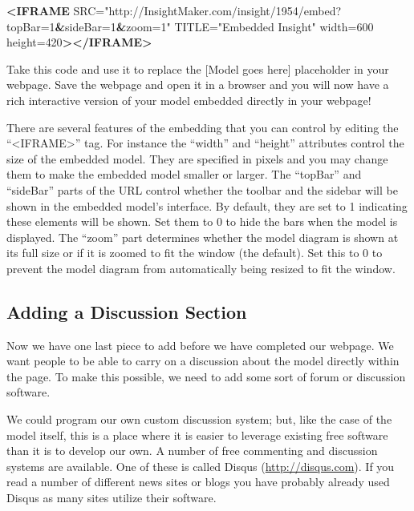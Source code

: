 \documentclass[]{memoir}
\newenvironment{Shaded}{}{}
\newcommand{\KeywordTok}[1]{\textcolor[rgb]{0.00,0.44,0.13}{\textbf{{#1}}}}
\newcommand{\StringTok}[1]{\textcolor[rgb]{0.25,0.44,0.63}{{#1}}}
\newcommand{\OtherTok}[1]{\textcolor[rgb]{0.00,0.44,0.13}{{#1}}}
\newcommand{\ErrorTok}[1]{\textcolor[rgb]{1.00,0.00,0.00}{\textbf{{#1}}}}
\begin{document}
\begin{Shaded}
\begin{Highlighting}[]
\KeywordTok{<IFRAME}\OtherTok{ SRC=}\StringTok{"http://InsightMaker.com/insight/1954/embed?topBar=1}\ErrorTok{&}\StringTok{sideBar=1}\ErrorTok{&}\StringTok{zoom=1"}
\OtherTok{TITLE=}\StringTok{"Embedded Insight"}\OtherTok{ width=}\StringTok{600}\OtherTok{ height=}\StringTok{420}\KeywordTok{></IFRAME>}
\end{Highlighting}
\end{Shaded}

Take this code and use it to replace the {[}Model goes here{]}
placeholder in your webpage. Save the webpage and open it in a browser
and you will now have a rich interactive version of your model embedded
directly in your webpage!

There are several features of the embedding that you can control by
editing the ``\textless{}IFRAME\textgreater{}'' tag. For instance the
``width'' and ``height'' attributes control the size of the embedded
model. They are specified in pixels and you may change them to make the
embedded model smaller or larger. The ``topBar'' and ``sideBar'' parts
of the URL control whether the toolbar and the sidebar will be shown in
the embedded model's interface. By default, they are set to 1 indicating
these elements will be shown. Set them to 0 to hide the bars when the
model is displayed. The ``zoom'' part determines whether the model
diagram is shown at its full size or if it is zoomed to fit the window
(the default). Set this to 0 to prevent the model diagram from
automatically being resized to fit the window.

\subsection{Adding a Discussion Section}

Now we have one last piece to add before we have completed our webpage.
We want people to be able to carry on a discussion about the model
directly within the page. To make this possible, we need to add some
sort of forum or discussion software.

We could program our own custom discussion system; but, like the case of
the model itself, this is a place where it is easier to leverage
existing free software than it is to develop our own. A number of free
commenting and discussion systems are available. One of these is called
Disqus (\url{http://disqus.com}). If you read a number of different news
sites or blogs you have probably already used Disqus as many sites
utilize their software.
\end{document}
